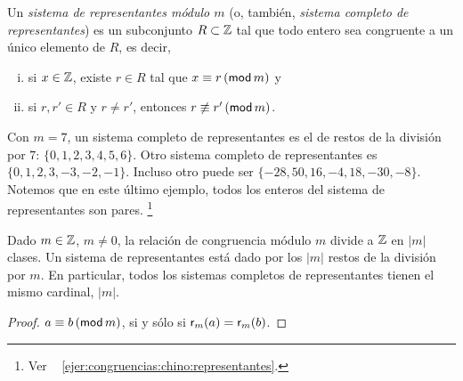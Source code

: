\begin{defCongruencias}\label{def:congruencias:sistema-completo}
	Un \emph{sistema de representantes m\'odulo $m$}
	(o, tambi\'en, \emph{sistema completo de representantes}) es un
	subconjunto $R\subset\Enteros$ tal que todo entero sea congruente
	a un \'unico elemento de $R$, es decir,
	\begin{enumerate}[(i)]
		\item\label{item:def:sistema-completo:existe}
			si $x\in\Enteros$, existe $r\in R$ tal que
			$x\equiv r\tmodulo[m]$ y
		\item\label{item:def:sistema-completo:unico}
			si $r,r'\in R$ y $r\neq r'$, entonces
			$r\not\equiv r'\tmodulo[m]$.
	\end{enumerate}
\end{defCongruencias}

\begin{ejemCongruencias}\label{ejem:congruencias:sistema-completo}
	Con $m=7$, un sistema completo de representantes es el de restos
	de la divisi\'on por $7$: $\{0,1,2,3,4,5,6\}$. Otro sistema completo
	de representantes es $\{0,1,2,3,-3,-2,-1\}$.
	Incluso otro puede ser $\{-28,50,16,-4,18,-30,-8\}$. Notemos que
	en este \'ultimo ejemplo, todos los enteros del sistema de
	representantes son pares.%
	\footnote{
		Ver \ejername~%
		\ref{ejer:congruencias:chino:representantes}.
	}
\end{ejemCongruencias}

\begin{teoCongruencias}\label{teo:congruencias:sistema-completo}
	Dado $m\in\Enteros$, $m\neq 0$, la relaci\'on de congruencia
	m\'odulo $m$ divide a $\Enteros$ en $|m|$ clases. Un sistema de
	representantes est\'a dado por los $|m|$ restos de la divisi\'on
	por $m$. En particular, todos los sistemas completos de
	representantes tienen el mismo cardinal, $|m|$.
\end{teoCongruencias}

\begin{proof}
	$a\equiv b\tmodulo[m]$, si y s\'olo si $\resto[m](a)=\resto[m](b)$.
\end{proof}

